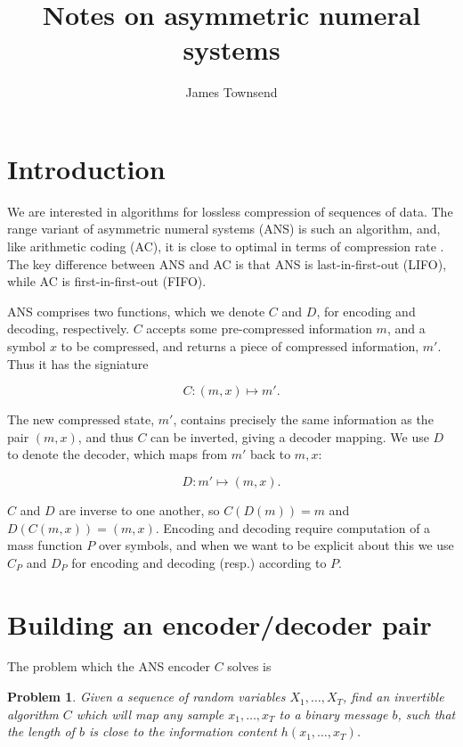 \documentclass{article}
\author{James Townsend}
\title{Notes on asymmetric numeral systems}
\newtheorem{problem}{Problem}
\begin{document}
\maketitle
\section{Introduction}
We are interested in algorithms for lossless compression of sequences of data.
The range variant of asymmetric numeral systems (ANS) is such an algorithm,
and, like arithmetic coding (AC), it is close to optimal in terms of
compression rate \citep{dudaAsymmetricNumeralSystems2009}. The key difference
between ANS and AC is that ANS is last-in-first-out (LIFO), while AC is
first-in-first-out (FIFO).

ANS comprises two functions, which we denote $C$ and $D$, for encoding and
decoding, respectively. $C$ accepts some pre-compressed information $m$, and a
symbol $x$ to be compressed, and returns a piece of compressed information,
$m'$. Thus it has the signiature

\begin{equation}
        C:(m, x) \mapsto m'.
\end{equation}

The new compressed state, $m'$, contains precisely the same information as the
pair $(m, x)$, and thus $C$ can be inverted, giving a decoder mapping. We use
$D$ to denote the decoder, which maps from $m'$ back to $m, x$:

\begin{equation}
        D:m' \mapsto (m, x).
\end{equation}

$C$ and $D$ are inverse to one another, so $C(D(m)) = m$ and $D(C(m,
x)) = (m, x)$. Encoding and decoding require computation of a mass function $P$
over symbols, and when we want to be explicit about this we use $C_P$ and $D_P$
for encoding and decoding (resp.) according to $P$.


\section{Building an encoder/decoder pair}
The problem which the ANS encoder $C$ solves is

\begin{problem}\label{prob:default}
        Given a sequence of random variables $X_1, \ldots, X_T$, find an
        invertible algorithm $C$ which will map any sample $x_1, \ldots, x_T$
        to a binary message $b$, such that the length of $b$ is close to the
        information content $h(x_1, \ldots, x_T)$.
\end{problem}
\end{document}
